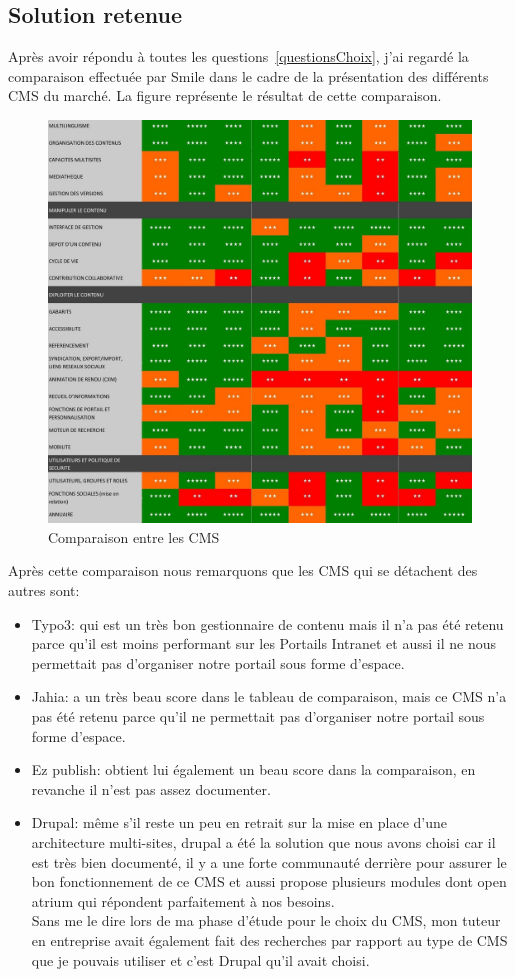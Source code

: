 \subsection{Solution retenue}
Après avoir répondu à toutes les questions~\ref{questionsChoix}, j'ai regardé la comparaison effectuée par Smile dans le cadre de la présentation des différents CMS du marché\cite{comparaison}. La figure représente le résultat de cette comparaison.
\begin{figure}[h]
\centering
\includegraphics[width=14.5cm]{comparaison.jpg}
\caption{\label{comparaisonRef}Comparaison entre les CMS\cite{comparaison}}
\end{figure}
\clearpage
Après cette comparaison nous remarquons que les CMS qui se détachent des autres sont:
\begin{itemize}
\item Typo3: qui est un très bon gestionnaire de contenu mais il n'a pas été retenu parce qu'il est moins performant sur les \og Portails Intranet\fg{}\cite{typo3} et aussi il ne nous permettait pas d'organiser notre portail sous forme d'espace.
\item Jahia: a un très beau score dans le tableau de comparaison, mais ce CMS n'a pas été retenu parce qu'il ne permettait pas d'organiser notre portail sous forme d'espace.
\item Ez publish: obtient lui également un beau score dans la comparaison, en revanche il n'est pas assez documenter.
\item Drupal: même s'il reste un peu en retrait sur la mise en place d'une architecture multi-sites, drupal a été la solution que nous avons choisi car il est très bien documenté, il y a une forte communauté derrière pour assurer le bon fonctionnement de ce CMS et aussi propose plusieurs modules dont \og open atrium\fg{} qui répondent parfaitement à nos besoins. \\Sans me le dire lors de ma phase d'étude pour le choix du CMS, mon tuteur en entreprise avait également fait des recherches par rapport au type de CMS que je pouvais utiliser et c'est Drupal qu'il avait choisi.
\end{itemize}
